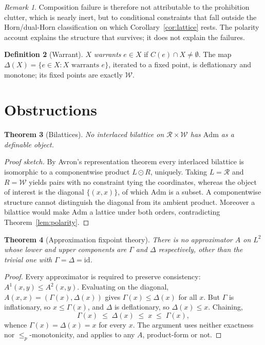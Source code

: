 \documentclass[11pt]{article}
\theoremstyle{definition}
\newtheorem{definition}{Definition}[section]
\theoremstyle{plain}
\newtheorem{theorem}[definition]{Theorem}
\theoremstyle{remark}
\newtheorem{remark}[definition]{Remark}
\newcommand{\Adm}{\mathrm{Adm}}
\begin{document}
\begin{remark}
Composition failure is therefore not attributable to the prohibition clutter,
which is nearly inert, but to conditional constraints that fall outside the
Horn/dual-Horn classification on which Corollary~\ref{cor:lattice} rests. The
polarity account explains the structure that survives; it does not explain the
failures.
\end{remark}

\begin{definition}[Warrant]
$X$ \emph{warrants} $e \in X$ if $C(e) \cap X \neq \emptyset$. The map
$\Delta(X) = \{e \in X : X \text{ warrants } e\}$, iterated to a fixed point, is
deflationary and monotone; its fixed points are exactly $\mathcal{W}$.
\end{definition}

\section{Obstructions}\label{sec:obstructions}

\begin{theorem}[Bilattices]\label{thm:bilattice}
No interlaced bilattice on $\mathcal{R} \times \mathcal{W}$ has $\Adm$ as a
definable object.
\end{theorem}

\begin{proof}[Proof sketch]
By Avron's representation theorem every interlaced bilattice is isomorphic to a
componentwise product $L \odot R$, uniquely. Taking $L = \mathcal{R}$ and
$R = \mathcal{W}$ yields pairs with no constraint tying the coordinates, whereas the object of
interest is the diagonal $\{(x,x)\}$, of which $\Adm$ is a subset. A componentwise
structure cannot distinguish the diagonal from its ambient product. Moreover a bilattice would make $\Adm$ a lattice under both
orders, contradicting Theorem~\ref{lem:polarity}.
\end{proof}

\begin{theorem}[Approximation fixpoint theory]\label{thm:aft}
There is no approximator $A$ on $L^2$ whose lower and upper components are
$\Gamma$ and $\Delta$ respectively, other than the trivial one with
$\Gamma = \Delta = \mathrm{id}$.
\end{theorem}

\begin{proof}
Every approximator is required to preserve consistency: $A^1(x,y) \le A^2(x,y)$.
Evaluating on the diagonal, $A(x,x) = (\Gamma(x), \Delta(x))$ gives
$\Gamma(x) \le \Delta(x)$ for all $x$. But $\Gamma$ is inflationary, so
$x \le \Gamma(x)$, and $\Delta$ is deflationary, so $\Delta(x) \le x$. Chaining,
\[
  \Gamma(x) \;\le\; \Delta(x) \;\le\; x \;\le\; \Gamma(x),
\]
whence $\Gamma(x) = \Delta(x) = x$ for every $x$. The argument uses neither
exactness nor $\le_p$-monotonicity, and applies to any $A$, product-form or not.
\end{proof}
\end{document}
